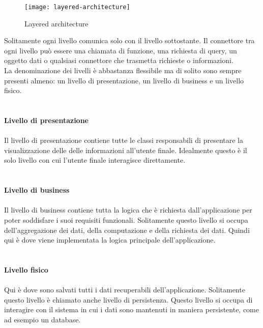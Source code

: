 \begin{figure}[H]
    \centering
    \texttt{[image: layered-architecture]}
    \caption{Layered architecture}
\end{figure}
\leavevmode\newline
Solitamente ogni livello comunica solo con il livello sottostante. Il connettore tra ogni livello può 
essere una chiamata di funzione, una richiesta di query, un oggetto dati o qualsiasi connettore che
trasmetta richieste o informazioni.
\\
La denominazione dei livelli è abbastanza flessibile ma di solito sono sempre presenti almeno: un livello di presentazione, un livello
di business e un livello fisico.
\\\\\\
\textbf{Livello di presentazione}
\\\\
Il livello di presentazione contiene tutte le classi responsabili di presentare la visualizzazione delle
delle informazioni all'utente finale. Idealmente questo è il solo livello con cui l'utente finale 
interagisce direttamente.
\\\\\\
\textbf{Livello di business}
\\\\
Il livello di business contiene tutta la logica che è richiesta dall'applicazione per poter soddisfare i 
suoi requisiti funzionali. Solitamente questo livello si occupa dell'aggregazione dei dati, della computazione
e della richiesta dei dati. Quindi qui è dove viene implementata la logica principale dell'applicazione.
\\\\\\
\textbf{Livello fisico}
\\\\
Qui è dove sono salvati tutti i dati recuperabili dell'applicazione. Solitamente questo livello è chiamato
anche livello di persistenza. Questo livello si occupa di interagire con il sistema in cui i dati 
sono mantenuti in maniera persistente, come ad esempio un database.

